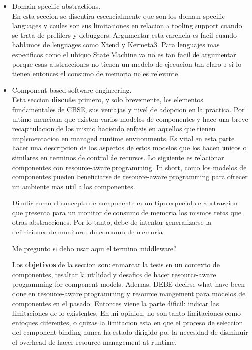 \begin{itemize}
\item Domain-specific abstractions. \\
En esta seccion se discutira escencialmente que son los domain-specific languages y caules son sus limitaciones en relacion a tooling support cuando se trata de profilers y debuggers. Argumentar esta carencia es facil cuando hablamos de lenguages como Xtend y Kermeta3. Para lenguajes mas especificos como el ubiquo State Machine ya no es tan facil de argumentar porque esas abstracciones no tienen un modelo de ejecucion tan claro o si lo tienen entonces el consumo de memoria no es relevante.

\item Component-based software engineering.\\
Esta seccion \textbf{discute} primero, y solo brevemente, los elementos fundamentales de CBSE, sus ventajas y nivel de adopcion en la practica. Por ultimo menciona que existen varios modelos de componentes y hace una breve recapitulacion de los mismo haciendo enfazis en aquellos que tienen implementacion en managed runtime environments.
Es vital en esta parte hacer una descripcion de los aspectos de estos modelos que los hacen unicos o similares en terminos de control de recursos.
Lo siguiente es relacionar componentes con resource-aware programming. In short, como los modelos de componentes pueden beneficiarse de resource-aware programming para ofrecer un ambiente mas util a los componentes. 

Disutir como el concepto de componente es un tipo especial de abstraccion que presenta para un monitor de consumo de memoria los mismos retos que otras abstracciones. Por lo tanto, debe de intentar generalizarse la definiciones de monitores de consumo de memoria

Me pregunto si debo usar aqui el termino middleware?

Los \textbf{objetivos} de la seccion son: enmarcar la tesis en un contexto de componentes, resaltar la utilidad y desafios de hacer resource-aware programming for component models. Ademas, DEBE decirse what have been done en resource-aware programming y resource mangement para modelos de componentes en el pasado.
Entonces viene la parte dificil: indicar las limitaciones de lo existentes. En mi opinion, no son tanto limitaciones como enfoques diferentes, o quizas la limitacion esta en que el proceso de seleccion del component binding nunca ha estado dirigido por la necesidad de disminuir el overhead de hacer resource management at runtime.

\end{itemize}


